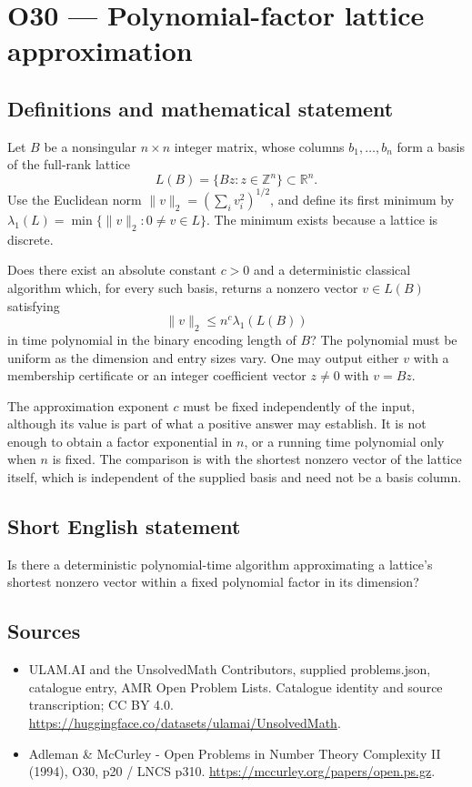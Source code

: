 \documentclass[11pt,a4paper]{article}
\begin{document}
\section*{O30 — Polynomial-factor lattice approximation}\label{statement}

\subsection{Definitions and mathematical statement}
Let $B$ be a nonsingular $n\times n$ integer matrix, whose columns $b_1,\ldots,b_n$ form a basis of the full-rank lattice
\[
L(B)=\{Bz:z\in\mathbb Z^n\}\subset\mathbb R^n.
\]
Use the Euclidean norm $\|v\|_2=(\sum_i v_i^2)^{1/2}$, and define its first minimum by $\lambda_1(L)=\min\{\|v\|_2:0\ne v\in L\}$. The minimum exists because a lattice is discrete.

Does there exist an absolute constant $c>0$ and a deterministic classical algorithm which, for every such basis, returns a nonzero vector $v\in L(B)$ satisfying
\[
\|v\|_2\le n^c\lambda_1(L(B))
\]
in time polynomial in the binary encoding length of $B$? The polynomial must be uniform as the dimension and entry sizes vary. One may output either $v$ with a membership certificate or an integer coefficient vector $z\ne0$ with $v=Bz$.

The approximation exponent $c$ must be fixed independently of the input, although its value is part of what a positive answer may establish. It is not enough to obtain a factor exponential in $n$, or a running time polynomial only when $n$ is fixed. The comparison is with the shortest nonzero vector of the lattice itself, which is independent of the supplied basis and need not be a basis column.
\subsection{Short English statement}
Is there a deterministic polynomial-time algorithm approximating a lattice’s shortest nonzero vector within a fixed polynomial factor in its dimension?
\subsection{Sources}
\begin{itemize}
\item[S1] ULAM.AI and the UnsolvedMath Contributors, supplied problems.json, catalogue entry, AMR Open Problem Lists. Catalogue identity and source transcription; CC BY 4.0.
\url{https://huggingface.co/datasets/ulamai/UnsolvedMath}.
\item[S2] Adleman \& McCurley - Open Problems in Number Theory Complexity II (1994), O30, p20 / LNCS p310. 
\url{https://mccurley.org/papers/open.ps.gz}.
\end{itemize}
\end{document}

